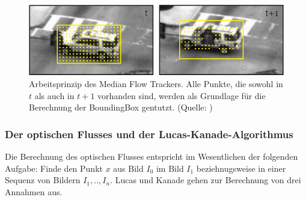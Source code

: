 	\begin{figure}
	\centering{}\includegraphics[scale=0.7]{../pictures/MediaFlow_0.png}\caption[Arbeitsweise des Median Flow Trackers]{Arbeitsprinzip des Median Flow Trackers. Alle Punkte, die sowohl in $t$ als auch in $t+1$ vorhanden sind, werden als Grundlage für die Berechnung der BoundingBox gentutzt. (Quelle: \cite{MFT})\label{fig:MFT} }
	\end{figure}

	\subsubsection{Der optischen Flusses und der Lucas-Kanade-Algorithmus}
	Die Berechnung des optischen Flusses entspricht im Wesentlichen der folgenden Aufgabe: Finde den Punkt $x$ aus Bild $I_{0}$ im Bild $I_{1}$ beziehnugsweise in einer Sequenz von Bildern $I_{1},..,I_{n}$. Lucas und Kanade gehen zur Berechnung von drei Annahmen aus.


